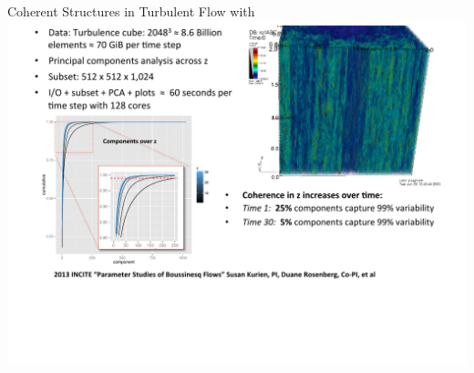 \begin{frame}
  \begin{block}{Coherent Structures in Turbulent Flow with \pbdR} 
    \includegraphics[width=\textwidth,trim=8ex 28ex 8ex 0ex,clip]{../common/pics/apps/TurbulentFlowINCITE.pdf}
  \end{block}
\end{frame}


